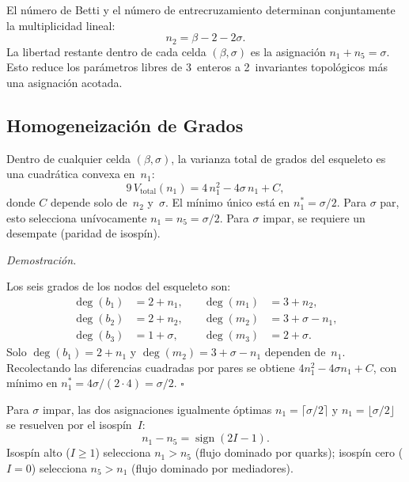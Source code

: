 \documentclass[11pt, a4paper, openany]{book}
\renewenvironment{proof}[1][Demostraci\'on]{%
  \par\noindent\textit{#1.}\quad
}{\hfill$\square$\par\medskip}
\begin{document}
\begin{theorem}
\label{thm:beta-sigma-class}
El n\'umero de Betti y el n\'umero de entrecruzamiento determinan
conjuntamente la multiplicidad lineal:
\begin{equation}
  n_2 = \beta - 2 - 2\sigma.
  \label{eq:n2-from-beta-sigma}
\end{equation}
La libertad restante dentro de cada celda $(\beta, \sigma)$ es la
asignaci\'on $n_1 + n_5 = \sigma$.  Esto reduce los par\'ametros
libres de 3~enteros a 2~invariantes topol\'ogicos m\'as una
asignaci\'on acotada.
\end{theorem}

\subsection{Homogeneizaci\'on de Grados}

\begin{theorem}
\label{thm:balanced-allocation}
Dentro de cualquier celda $(\beta, \sigma)$, la varianza total de
grados del esqueleto es una cuadr\'atica convexa en~$n_1$:
\[
  9\,V_{\mathrm{total}}(n_1)
  = 4\,n_1^2 - 4\sigma\, n_1 + C,
\]
donde $C$ depende solo de~$n_2$ y~$\sigma$.  El m\'inimo \'unico
est\'a en $n_1^* = \sigma/2$.  Para $\sigma$ par, esto selecciona
un\'ivocamente $n_1 = n_5 = \sigma/2$.  Para $\sigma$ impar, se
requiere un desempate (paridad de isosp\'in).
\end{theorem}

\begin{proof}
Los seis grados de los nodos del esqueleto son:
\[
\begin{aligned}
  \deg(b_1) &= 2 + n_1, &\quad \deg(m_1) &= 3 + n_2, \\
  \deg(b_2) &= 2 + n_2, &\quad \deg(m_2) &= 3 + \sigma - n_1, \\
  \deg(b_3) &= 1 + \sigma, &\quad \deg(m_3) &= 2 + \sigma.
\end{aligned}
\]
Solo $\deg(b_1) = 2 + n_1$ y $\deg(m_2) = 3 + \sigma - n_1$
dependen de~$n_1$.  Recolectando las diferencias cuadradas por
pares se obtiene $4n_1^2 - 4\sigma n_1 + C$, con m\'inimo en
$n_1^* = 4\sigma / (2 \cdot 4) = \sigma/2$.
\end{proof}

\begin{theorem}
\label{thm:isospin-parity}
Para $\sigma$ impar, las dos asignaciones igualmente \'optimas
$n_1 = \lceil\sigma/2\rceil$ y $n_1 = \lfloor\sigma/2\rfloor$
se resuelven por el isosp\'in~$I$:
\[
  n_1 - n_5 = \operatorname{sign}(2I - 1).
\]
Isosp\'in alto ($I \geq 1$) selecciona $n_1 > n_5$ (flujo dominado
por quarks); isosp\'in cero ($I = 0$) selecciona $n_5 > n_1$
(flujo dominado por mediadores).
\end{theorem}
\end{document}
